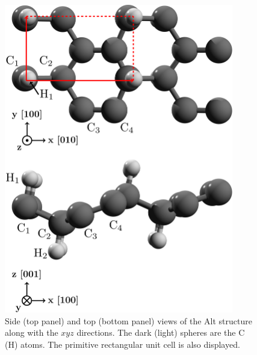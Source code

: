 \documentclass[floatfix,prb,aps,superscriptaddress,showpacs,11pt,preprint,letterpaper]{revtex4}
\def\tama{10cm}
\begin{document}
\begin{figure}[ht!]
    \centering
    \includegraphics[width=\tama]{figures/fig2}
    \caption{Side (top panel) and top (bottom panel) views of the Alt
      structure along with the $xyz$ directions. The dark (light) spheres are
      the C (H) atoms. The primitive rectangular unit cell is also displayed.}
    \label{fig:alt-struc}
\end{figure}
\end{document}
